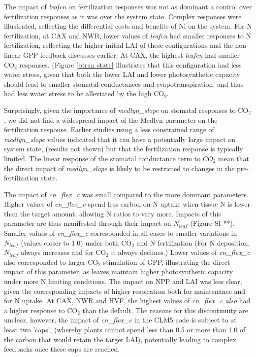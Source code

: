 \documentclass[draft,linenumbers]{agujournal}
\begin{document}
The impact of \emph{leafcn} on fertilization responses was not as dominant a control over fertilization responses as it was over the system state. Complex responses were illustrated, reflecting the differential costs and benefits of Ni on the system.  For N fertilization, at CAX and NWR, lower values of \emph{leafcn} had smaller responses to N fertilization, reflecting the higher initial LAI of these configurations and the non-linear GPP feedback discusses earlier.   At CAX, the highest \emph{leafcn} had smaller CO$_{2}$ responses. (Figure \ref{btran state} illustrates that this configuration had less water stress, given that both the lower LAI and lower photosynthetic capacity should lead to smaller stomatal conductances and evapotranspiration. and thus had less water stress to be alleviated by the high CO$_{2}$.

Surprisingly, given the importance of \emph{medlyn\_slope} on stomatal responses to CO$_{2}$, we did not find a widespread impact of the Medlyn parameter on the fertilization response. Earlier studies using a less constrained range of \emph{medlyn\_slope} values indicated that it can have a potentially large impact on system state, (results not shown) but that the fertilization response is typically limited. The linear response of the stomatal conductance term to $CO_{2}$ mean that the direct impact of \emph{medlyn\_slope} is likely to be restricted to changes in the pre-fertilization state. 

The impact of \emph{cn\_flex\_c} was small compared to the more dominant parameters. Higher values of \emph{cn\_flex\_c} spend less carbon on N uptake when tissue N is lower than the target amount, allowing N ratios to vary more. Impacts of this parameter are thus manifested through their impact on $N_{leaf}$ (Figure SI **).  Smaller values of \emph{cn\_flex\_c} corresponded in all cases to smaller variations in $N_{leaf}$ (values closer to 1.0) under both CO$_{2}$ and N fertilization (For N deposition, $N_{leaf}$ always increases and for CO$_{2}$ it always declines.) Lower values of \emph{cn\_flex\_c} also corresponded to larger CO$_{2}$ stimulation of GPP, illustrating the direct impact of this parameter, as leaves maintain higher photosynthetic capacity under more N limiting conditions. The impact on NPP and LAI was less clear, given the corresponding impacts of higher respiration both for maintenance and for N uptake. At CAX, NWR and HVF,  the highest values of \emph{cn\_flex\_c} \emph{also} had a higher response to CO$_{2}$ than the default. The reasons for this discontinuity are unclear, however, the impact of \emph{cn\_flex\_c} in the CLM5 code is subject to at least two 'caps', (whereby plants cannot spend less than 0.5 or more than 1.0 of the carbon that would retain the target LAI), potentially leading to complex feedbacks once these caps are reached.  
\end{document}
